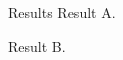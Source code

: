 \documentclass[overlay-policy=pages]{beamer-accessibility}
\begin{document}
\begin{frame}{Results}
Result A.\par\pause Result B.
\end{frame}
\end{document}
